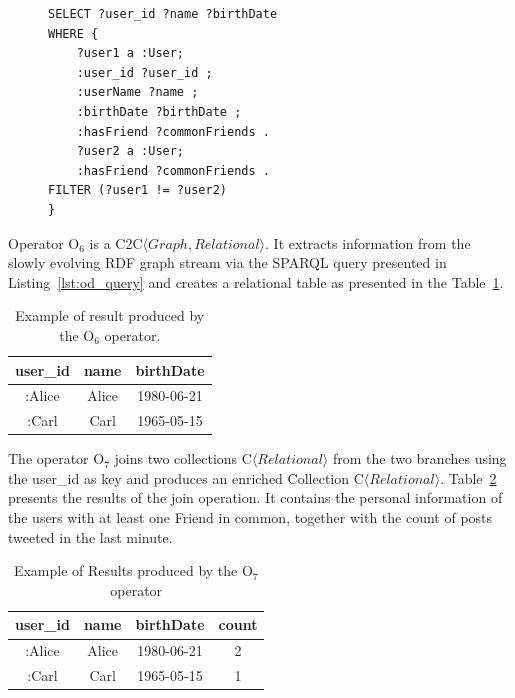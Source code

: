 \begin{Example}
\begin{figure}[ht]
\begin{minipage}{0.95\linewidth}
\begin{lstlisting}[caption={SPAQL query applied by operator O$_6$ to the RDF stream to project information about the user.},label=lst:od_query,style=SPARQL]
SELECT ?user_id ?name ?birthDate
WHERE {
    ?user1 a :User;
    :user_id ?user_id ;
    :userName ?name ;
    :birthDate ?birthDate ;
    :hasFriend ?commonFriends .
    ?user2 a :User;
    :hasFriend ?commonFriends .    
FILTER (?user1 != ?user2)
} 
\end{lstlisting}
\end{minipage}
\end{figure}

\medskip

Operator O$_6$ is a C2C$\langle Graph,Relational\rangle$.
It extracts information from the slowly evolving RDF graph stream via the SPARQL query presented in Listing~\ref{lst:od_query} and creates a relational table as presented in the Table~\ref{tbl:od_res}.

\begin{table}[ht]
\centering
\caption{Example of result produced by the O$_6$ operator.}
\label{tbl:od_res}
    \begin{tabular}{|c|c|c|}
        \hline
        \textbf{user\_id} & \textbf{name} & \textbf{birthDate} \\ \hline
        :Alice             & Alice         & 1980-06-21         \\ \hline
        :Carl              & Carl          & 1965-05-15         \\ \hline
    \end{tabular}
\end{table}

The operator O$_7$ joins two collections C$\langle Relational\rangle$ from the two branches using the user\_id as key and produces an enriched Collection C$\langle Relational\rangle$. 
Table~\ref{tbl:oe_res} presents the results of the join operation. 
It contains the personal information of the users with at least one Friend in common, together with the count of posts tweeted in the last minute.

\begin{table}[ht]
\centering
\caption{Example of Results produced by the O$_7$ operator}
\label{tbl:oe_res}
    \begin{tabular}{|c|c|c|c|}
        \hline
        \textbf{user\_id} & \textbf{name} & \textbf{birthDate} & \textbf{count} \\ \hline
        :Alice             & Alice        & 1980-06-21         & 2              \\ \hline
        :Carl              & Carl         & 1965-05-15         & 1              \\ \hline
    \end{tabular}
\end{table}
\end{Example}

